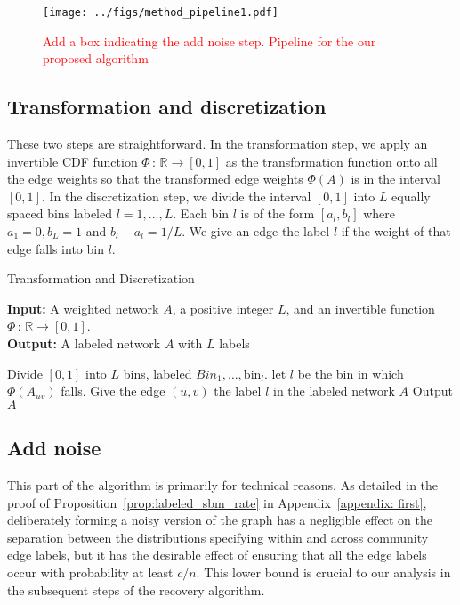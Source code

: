 \documentclass{article}
\newcommand{\bin}{\text{bin}}
\begin{document}
 
\begin{figure}[htp]
\centering
\texttt{[image: ../figs/method\_pipeline1.pdf]}
\caption{\textcolor{red}{Add a box indicating the add noise step. Pipeline for the our proposed algorithm}}
\label{fig:method_pipeline1}
\end{figure}



\subsection{Transformation and discretization}

These two steps are straightforward. In the transformation step, we apply an invertible CDF function $\Phi \,:\, \mathbb{R} \rightarrow [0,1]$ as the transformation function onto all the edge weights so that the transformed edge weights $\Phi(A)$ is in the interval $[0,1]$. In the discretization step, we divide the interval $[0,1]$ into $L$ equally spaced bins labeled $l=1, \dots, L$. Each bin $l$ is of the form $[a_l, b_l]$ where $a_1 = 0, b_L = 1$ and $b_l - a_l = 1/L$. We give an edge the label $l$ if the weight of that edge falls into bin $l$. 

\begin{algorithm}
\caption{Transformation and Discretization}
\label{alg:transform_and_discretize}
\textbf{Input:} A weighted network $A$, a positive integer $L$, and an invertible function $\Phi \,:\, \mathbb{R} \rightarrow [0,1]$.\\
\textbf{Output:} A labeled network $A$ with $L$ labels\\

\begin{algorithmic}
\State Divide $[0,1]$ into $L$ bins, labeled $Bin_1, \dots, \bin_l$.
   \State let $l$ be the bin in which $\Phi(A_{uv})$ falls.
   \State Give the edge $(u,v)$ the label $l$ in the labeled network $A$
\EndFor
\State Output $A$
\end{algorithmic}
\end{algorithm}

\subsection{Add noise}

This part of the algorithm is primarily for technical reasons. As detailed in the proof of Proposition~\ref{prop:labeled_sbm_rate} in Appendix~\ref{appendix: first}, deliberately forming a noisy version of the graph has a negligible effect on the separation between the distributions specifying within and across community edge labels, but it has the desirable effect of ensuring that all the edge labels occur with probability at least $c/n$. This lower bound is crucial to our analysis in the subsequent steps of the recovery algorithm.
\end{document}

